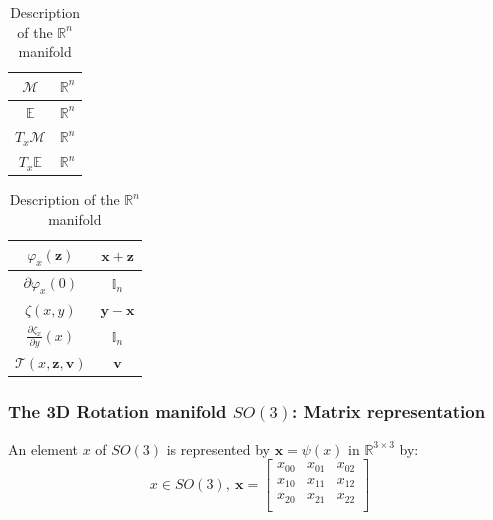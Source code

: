 \begin{table} [H]
\caption{Description of the $\mathbb{R}^n$ manifold}
\centering
\begin{tabular}{cc}
  \toprule
  $\mathcal{M}$ & $\mathbb{R}^n$ \\
  \midrule
  $\mathbb{E}$ & $\mathbb{R}^n$ \\
  \midrule
  $T_x\mathcal{M}$ & $\mathbb{R}^n$ \\
  \midrule
  $T_x\mathbb{E}$ & $\mathbb{R}^n$ \\
  \bottomrule
\end{tabular}
\quad
\begin{tabular}{cc}
  \toprule
  $\varphi_x(\mathbf{z})$ & $\mathbf{x} + \mathbf{z}$ \\
  \midrule
  $\partial \varphi_x(0)$ & $\mathbb{I}_n$ \\
  \midrule
  $\zeta(x,y)$ & $\mathbf{y} - \mathbf{x}$ \\
  \midrule
  $\frac{\partial \zeta_x}{\partial y}(x)$ & $\mathbb{I}_n$ \\
  \midrule
  $\mathcal{T}(x,\mathbf{z}, \mathbf{v})$ & $\mathbf{v}$ \\
  \bottomrule
\end{tabular}
\end{table}
\subsubsection{The 3D Rotation manifold $SO(3)$: Matrix representation}
\label{ssub:the_3d_rotation_manifold_matrix_representation}

An element $x$ of $SO(3)$ is represented by $\mathbf{x}=\psi(x)$ in $\mathbb{R}^{3\times 3}$ by:
\begin{equation}
  x\in SO(3),\ \mathbf{x} =\begin{bmatrix}
    x_{00} & x_{01} & x_{02} \\
    x_{10} & x_{11} & x_{12} \\
    x_{20} & x_{21} & x_{22} \\
  \end{bmatrix}
\end{equation}

